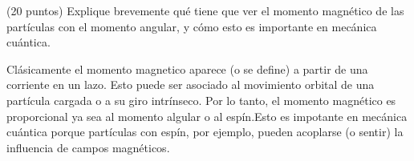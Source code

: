 \question [1] (20 puntos) Explique brevemente qué tiene que ver el momento magnético de las partículas con el momento angular, y cómo esto es importante en mecánica cuántica.

\begin{solution}

Clásicamente el momento magnetico aparece (o se define) a partir de una corriente en un lazo. Esto puede ser asociado al movimiento orbital de una partícula cargada o a su giro intrínseco. Por lo tanto, el momento magnético es proporcional ya sea al momento algular o al espín.Esto es impotante en mecánica cuántica porque partículas con espín, por ejemplo, pueden acoplarse (o sentir) la influencia de campos magnéticos. 

\end{solution}

\vspace{1.0cm}